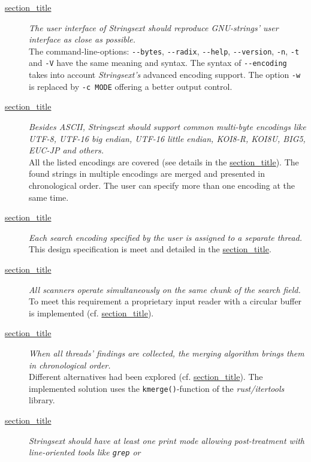 \begin{description}
\item[{\protect\hyperlink{user-interface}{section\_title}}]
\emph{The user interface of Strings­ext should reproduce GNU-strings'
user interface as close as possible.}\\
The command-line-options: \texttt{-\/-bytes}, \texttt{-\/-radix},
\texttt{-\/-help}, \texttt{-\/-version}, \texttt{-n}, \texttt{-t} and
\texttt{-V} have the same meaning and syntax. The syntax of
\texttt{-\/-encoding} takes into account \emph{Stringsext's} advanced
encoding support. The option \texttt{-w} is replaced by
\texttt{-c\ MODE} offering a better output control.
\item[{\protect\hyperlink{character-encoding-support}{section\_title}}]
\emph{Besides ASCII, Strings­ext should support common multi-byte
encodings like UTF-8, UTF-16 big endian, UTF-16 little endian, KOI8-R,
KOI8U, BIG5, EUC-JP and others.}\\
All the listed encodings are covered (see details in the
\protect\hyperlink{decoder}{section\_title}). The found strings in
multiple encodings are merged and presented in chronological order. The
user can specify more than one encoding at the same time.
\item[{\protect\hyperlink{req-concurrent}{section\_title}}]
\emph{Each search encoding specified by the user is assigned to a
separate thread.}\\
This design specification is meet and detailed in the
\protect\hyperlink{_concurrency}{section\_title}.
\item[{\protect\hyperlink{req-batch-processing}{section\_title}}]
\emph{All scanners operate simultaneously on the same chunk of the
search field.}\\
To meet this requirement a proprietary input reader with a circular
buffer is implemented (cf.
\protect\hyperlink{_polymorphic_io}{section\_title}).
\item[{\protect\hyperlink{req-merge-findings}{section\_title}}]
\emph{When all threads' findings are collected, the merging algorithm
brings them in chronological order.}\\
Different alternatives had been explored (cf.
\protect\hyperlink{_merging_vectors}{section\_title}). The implemented
solution uses the \texttt{kmerge()}-function of the
\emph{rust/itertools} library.
\item[{\protect\hyperlink{req-post-treatment}{section\_title}}]
\emph{Strings­ext should have at least one print mode allowing
post-treatment with line-oriented tools like \texttt{grep} or
}
\end{description}
